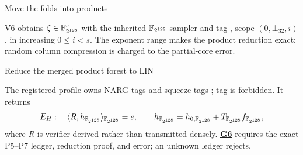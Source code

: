 \vspace*{0.10in}
\begin{pvstep}[2.15in]{Move the folds into products}{%
}
\begin{pvexchange}
\Vsend{\Dbadge{\zeta}}
\end{pvexchange}
V6 obtains $\zeta\in\mathbb F_{2^{128}}^s$ with the inherited $\mathbb F_{2^{128}}$ sampler and tag
, scope
$(0,\bot_{32},i)$, in increasing $0\le i<s$.  The exponent range makes the
product reduction exact; random column compression is charged to the
partial-core error.
\end{pvstep}

\begin{pvstep}[2.3in]{Reduce the merged product forest to LIN}{%
}
\begin{pvexchange}
\end{pvexchange}
The registered profile owns NARG tags  and squeeze tags
; tag  is forbidden.  It returns
\begin{equation}
 E_H:\quad \langle R,h_{\mathbb F_{2^{128}}}\rangle_{\mathbb F_{2^{128}}}=e,
 \qquad h_{\mathbb F_{2^{128}}}=h_{0,\mathbb F_{2^{128}}}+T_{\mathbb F_{2^{128}}}f_{\mathbb F_{2^{128}}},
 \label{eq:sha-gkr-lin}
\end{equation}
where $R$ is verifier-derived rather than transmitted densely.
\textbf{\hyperlink{gap:sha-g6}{G6}} requires the exact P5--P7 ledger,
reduction proof, and error; an unknown ledger rejects.
\end{pvstep}

